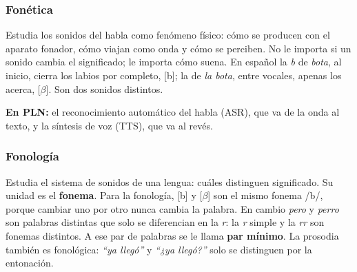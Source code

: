 \documentclass[11pt,letterpaper]{article}
\begin{document}
\begin{center}
\end{center}

\subsubsection*{Fonética}

Estudia los sonidos del habla como fenómeno físico: cómo se producen
con el aparato fonador, cómo viajan como onda y cómo se perciben. No le
importa si un sonido cambia el significado; le importa cómo suena. En
español la \textit{b} de \textit{bota}, al inicio, cierra los labios
por completo, [b]; la de \textit{la bota}, entre vocales, apenas los
acerca, [$\beta$]. Son dos sonidos distintos.

\textbf{En PLN:} el reconocimiento automático del habla (ASR), que va
de la onda al texto, y la síntesis de voz (TTS), que va al revés.

\subsubsection*{Fonología}

Estudia el sistema de sonidos de una lengua: cuáles distinguen
significado. Su unidad es el \textbf{fonema}. Para la fonología, [b] y
[$\beta$] son el mismo fonema /b/, porque cambiar uno por otro nunca
cambia la palabra. En cambio \textit{pero} y \textit{perro} son
palabras distintas que solo se diferencian en la \textit{r}: la
\textit{r} simple y la \textit{rr} son fonemas distintos. A ese par de
palabras se le llama \textbf{par mínimo}. La prosodia también es
fonológica: \textit{``ya llegó''} y \textit{``¿ya llegó?''} solo se
distinguen por la entonación.
\end{document}
